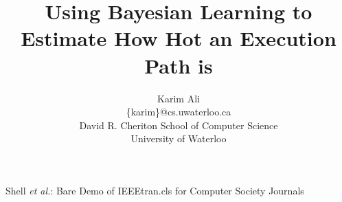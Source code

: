 \documentclass[12pt,journal,letterpaper,compsoc]{IEEEtran}
\begin{document}
\title{Using Bayesian Learning to Estimate How Hot an Execution Path is}

\author{Karim Ali\\
\{karim\}@cs.uwaterloo.ca \\
David R. Cheriton School of Computer Science\\
University of Waterloo\\
}

%
{Shell \MakeLowercase{\textit{et al.}}: Bare Demo of IEEEtran.cls for Computer Society Journals}


\maketitle
\end{document}

